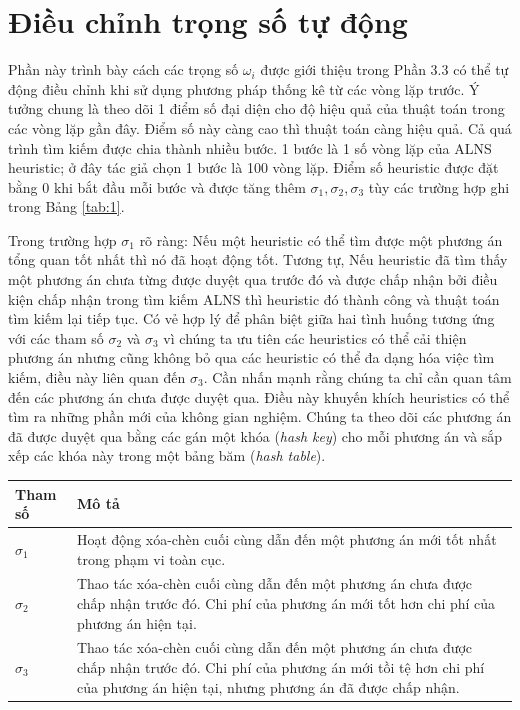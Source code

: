 \section{Điều chỉnh trọng số tự động}
Phần này trình bày cách các trọng số $\omega_i$ được giới thiệu trong Phần 3.3 có thể tự động điều chỉnh khi sử dụng phương pháp thống kê từ các vòng lặp trước. Ý tưởng chung là theo dõi 1 điểm số đại diện cho độ hiệu quả của thuật toán trong các vòng lặp gần đây. Điểm số này càng cao thì thuật toán càng hiệu quả. Cả quá trình tìm kiếm được chia thành nhiều bước. 1 bước là 1 số vòng lặp của ALNS heuristic; ở đây tác giả chọn 1 bước là 100 vòng lặp. Điểm số heuristic được đặt bằng 0 khi bắt đầu mỗi bước và được tăng thêm $\sigma_1, \sigma_2, \sigma_3$ tùy các trường hợp ghi trong Bảng \ref{tab:1}.

Trong trường hợp $\sigma_1$ rõ ràng: Nếu một heuristic có thể tìm được một phương án tổng quan tốt nhất thì nó đã hoạt động tốt. Tương tự, Nếu heuristic  đã tìm thấy một phương án chưa từng được duyệt qua trước đó và được chấp nhận bởi điều kiện chấp nhận trong tìm kiếm ALNS thì heuristic đó thành công và thuật toán tìm kiếm lại tiếp tục. Có vẻ hợp lý để phân biệt giữa hai tình huống tương ứng với các tham số $\sigma_2$ và $\sigma_3$ vì chúng ta ưu tiên các heuristics có thể cải thiện phương án nhưng cũng không bỏ qua các heuristic có thể đa dạng hóa việc tìm kiếm, điều này liên quan đến $\sigma_3$. Cần nhấn mạnh rằng chúng ta chỉ cần quan tâm đến các phương án chưa được duyệt qua. Điều này khuyến khích heuristics có thể tìm ra những phần mới của không gian nghiệm. Chúng ta theo dõi các phương án đã được duyệt qua bằng các gán một khóa (\textit{hash key}) cho mỗi phương án và sắp xếp các khóa này trong một bảng băm (\textit{hash table}).

\begin{table}[caption={Kết quả tốt nhất, 200 địa điểm}, label=tab:1]
            \begin{tabular}{lp{10cm}}
            \hline
            Tham số     &   Mô tả \\
            \hline
            $\sigma_1$  &   Hoạt động xóa-chèn cuối cùng dẫn đến một phương án mới tốt nhất trong phạm vi toàn cục. \\
            $\sigma_2$  &   Thao tác xóa-chèn cuối cùng dẫn đến một phương án chưa được chấp nhận trước đó. Chi phí của phương án mới tốt hơn chi phí của phương án hiện tại. \\
            $\sigma_3$  &   Thao tác xóa-chèn cuối cùng dẫn đến một phương án chưa được chấp nhận trước đó. Chi phí của phương án mới tồi tệ hơn chi phí của phương án hiện tại, nhưng phương án đã được chấp nhận. \\
            \hline
        \end{tabular} \\
\end{table}

